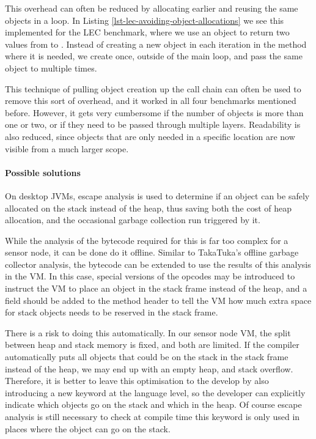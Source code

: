 This overhead can often be reduced by allocating earlier and reusing the same objects in a loop. In Listing \ref{lst-lec-avoiding-object-allocations} we see this implemented for the LEC benchmark, where we use an object to return two values from  to . Instead of creating a new object in each iteration in the  method where it is needed, we create  once, outside of the main loop, and pass the same object to  multiple times.

This technique of pulling object creation up the call chain can often be used to remove this sort of overhead, and it worked in all four benchmarks mentioned before. However, it gets very cumbersome if the number of objects is more than one or two, or if they need to be passed through multiple layers. Readability is also reduced, since objects that are only needed in a specific location are now visible from a much larger scope.

\paragraph{Possible solutions}
On desktop JVMs, escape analysis \cite{Choi:1999uw, Goetz:2005uy} is used to determine if an object can be safely allocated on the stack instead of the heap, thus saving both the cost of heap allocation, and the occasional garbage collection run triggered by it.

While the analysis of the bytecode required for this is far too complex for a sensor node, it can be done do it offline. Similar to TakaTuka's offline garbage collector analysis, the bytecode can be extended to use the results of this analysis in the VM. In this case, special versions of the  opcodes may be introduced to instruct the VM to place an object in the stack frame instead of the heap, and a field should be added to the method header to tell the VM how much extra space for stack objects needs to be reserved in the stack frame.

There is a risk to doing this automatically. In our sensor node VM, the split between heap and stack memory is fixed, and both are limited. If the compiler automatically puts all objects that could be on the stack in the stack frame instead of the heap, we may end up with an empty heap, and stack overflow. Therefore, it is better to leave this optimisation to the develop by also introducing a new keyword at the language level, so the developer can explicitly indicate which objects go on the stack and which in the heap. Of course escape analysis is still necessary to check at compile time this keyword is only used in places where the object can go on the stack.

